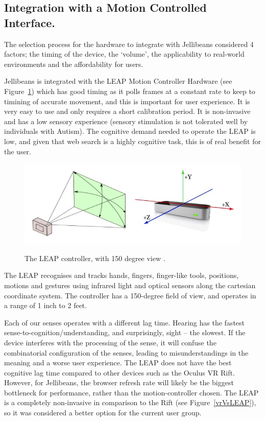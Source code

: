 \documentclass[a4paper, 11pt]{article}
\begin{document}
\subsection{Integration with a Motion Controlled Interface.}

The selection process for the hardware to integrate with Jellibeans considered 4 factors; the timing of the device, the `volume', the applicability to real-world environments and the affordability for users.

\vspace{5mm}
Jellibeans is integrated with the LEAP Motion Controller Hardware (see Figure~\ref{leap}) which has good timing as it polls frames at a constant rate to keep to timining of accurate movement, and this is important for user experience. It is very easy to use and only requires a short calibration period. It is non-invasive and has a low sensory experience (sensory stimulation is not tolerated well by individuals with Autism). The cognitive demand needed to operate the LEAP is low, and given that web search is a highly cognitive task, this is of real benefit for the user.

\begin{figure}[H]
\begin{center}
\includegraphics[scale=0.3]{leap}\\
\caption{The LEAP controller, with 150 degree view \cite{leap}.}
\label{leap}
\end{center}
\end{figure}

The LEAP recognises and tracks hands, fingers, finger-like tools, positions, motions and gestures using infrared light and optical sensors along the cartesian coordinate system. The controller has a 150-degree field of view, and operates in a range of 1 inch to 2 feet.  

\vspace{5mm}
Each of our senses operates with a different lag time. Hearing has the fastest sense-to-cognition/understanding, and surprisingly, sight -- the slowest. If the device interferes with the processing of the sense, it will confuse the combinatorial configuration of the senses, leading to misunderstandings in the meaning and a worse user experience. The LEAP does not have the best cognitive lag time compared to other devices such as the Oculus VR Rift. However, for Jellibeans, the browser refresh rate will likely be the biggest bottleneck for performance, rather than the motion-controller chosen. The LEAP is a completely non-invasive in comparison to the Rift (see Figure~\ref{vrVsLEAP}), so it was considered a better option for the current user group.
\end{document}
